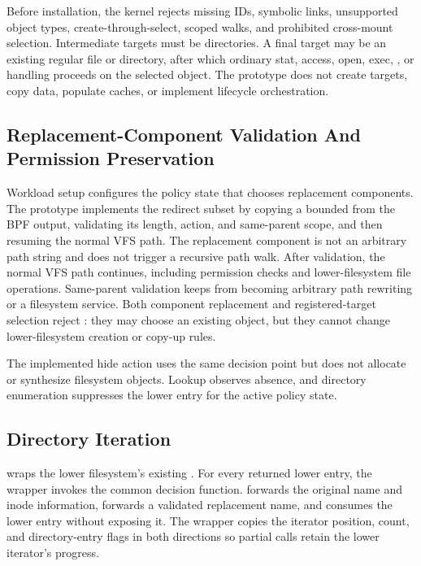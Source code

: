 Before installation, the kernel rejects missing IDs, symbolic links,
unsupported object types, create-through-select, scoped walks, and prohibited
cross-mount selection. Intermediate targets must be directories. A final target
may be an existing regular file or directory, after which ordinary stat,
access, open, exec, , or  handling proceeds on
the selected object. The prototype does not create targets, copy data, populate
caches, or implement lifecycle orchestration.

\subsection{Replacement-Component Validation And Permission Preservation}

Workload setup configures the policy state that chooses replacement components.
The prototype implements the redirect subset by copying a bounded
 from the BPF output, validating its length, action, and
same-parent scope, and then resuming the normal VFS path. The replacement
component is not an
arbitrary path string and does not trigger a recursive path walk. After
validation, the normal VFS path continues, including permission checks and
lower-filesystem file operations. Same-parent validation keeps \namei from
becoming arbitrary path rewriting or a filesystem service. Both component
replacement and registered-target selection reject : they
may choose an existing object, but they cannot change lower-filesystem creation
or copy-up rules.

The implemented hide action uses the same decision point but does not allocate
or synthesize filesystem objects. Lookup observes absence, and directory
enumeration suppresses the lower entry for the active policy state.

\subsection{Directory Iteration}

 wraps the lower filesystem's existing
. For every returned lower entry, the wrapper invokes
the common decision function.  forwards the original name and inode
information,  forwards a validated replacement name, and
 consumes the lower entry without exposing it. The wrapper copies
the iterator position, count, and directory-entry flags in both directions so
partial  calls retain the lower iterator's progress.

